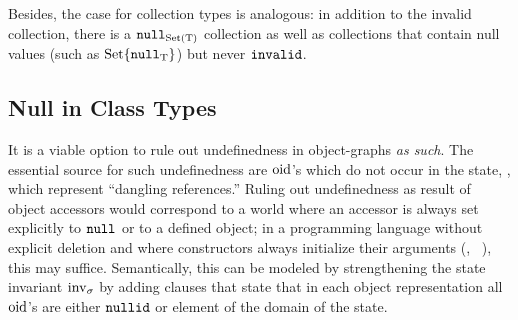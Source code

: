 Besides, the case for collection types is analogous: in addition to the invalid
collection, there is a ${\mathtt{null}_\text{{Set(T)}}}$ collection as well as collections that
contain null values (such as $\text{Set}\{{\mathtt{null}_\text{{T}}}\}$) but never
$\mathtt{invalid}$.

\subsection{Null in Class Types}
It is a viable option to rule out undefinedness in object-graphs \emph{as such}.
The essential source for such undefinedness are $\mathrm{oid}$'s which do not occur in
the state, \ie, which represent ``dangling references.'' Ruling out
undefinedness as result of object accessors would correspond to a world where an
accessor is always set explicitly to ${\mathtt{null}_\text{{}}}$ or to a defined object; in a
programming language without explicit deletion and where constructors always
initialize their arguments (\eg, \Specsharp~\cite{barnett.ea:spec:2004}), this
may suffice. Semantically, this can be modeled by strengthening the state
invariant $\operatorname{inv}_\sigma$ by adding clauses that state that in each object
representation all $\mathrm{oid}$'s are either $\mathtt{nullid}$ or element of the domain of the
state.

